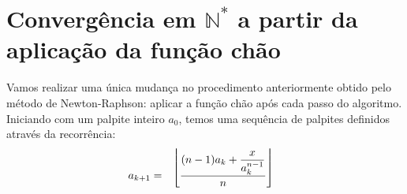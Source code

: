 \section*{Convergência em $\mathds{N}^*$
          a partir da aplicação da função chão}

Vamos realizar uma única mudança
no procedimento anteriormente obtido pelo método de Newton-Raphson:
aplicar a função chão após cada passo do algoritmo.
Iniciando com um palpite inteiro $a_0$,
temos uma sequência de palpites
definidos através da recorrência:
\[
  a_{k+1}
  = \bracketize[.75em]{\lfloor}{\rfloor}{
      \dfrac{(n-1) a_k + \dfrac{x}{a_k^{n-1}}}{n}
    }
\]


